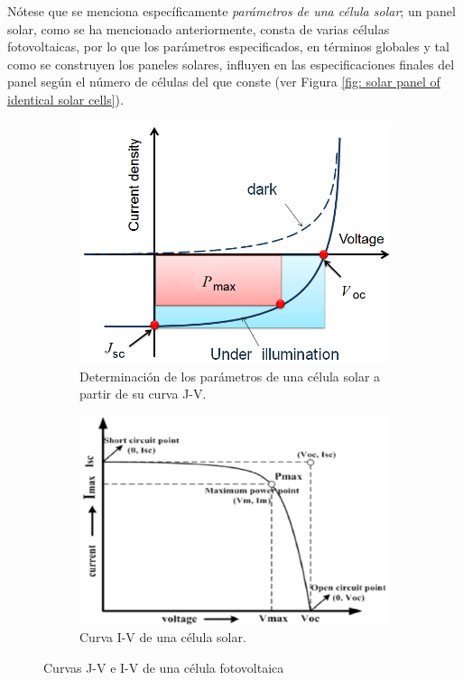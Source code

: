 \documentclass[12pt]{article}
\begin{document}
	\noindent Nótese que se menciona específicamente \textit{parámetros de una célula solar}; un panel solar, como se ha mencionado anteriormente, consta de varias células fotovoltaicas, por lo que los parámetros especificados, en términos globales y tal como se construyen los paneles solares, influyen en las especificaciones finales del panel según el número de células del que conste (ver Figura \ref{fig: solar panel of identical solar cells}). \\
		\begin{figure}[h]
		\begin{subfigure}{0.5\textwidth}
			\includegraphics[width=1\textwidth]{img/JV_curve_solarCell.png} 
			\caption{Determinación de los parámetros de una célula solar a partir de su curva J-V.}
			\label{fig: curva J-V célula solar}
		\end{subfigure}
		\begin{subfigure}{0.5\textwidth}
			\includegraphics[width=1\linewidth]{img/IV_curve_solarCell.png}
			\caption{Curva I-V de una célula solar.}
			\label{fig: I-V curve of a solar cell}
		\end{subfigure}
		\caption{Curvas J-V e I-V de una célula fotovoltaica}
		\label{fig:curvas J-V e I-V célula PV}
	\end{figure}
\end{document}
